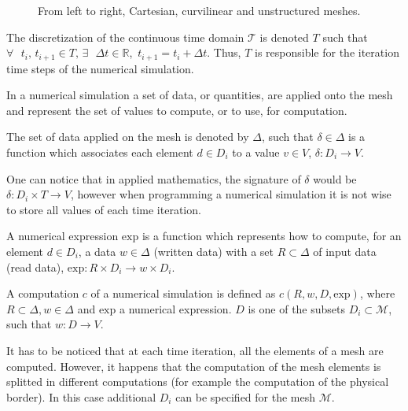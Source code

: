 \begin{figure}[!h]\begin{center}
  \caption{From left to right, Cartesian, curvilinear and unstructured meshes.}
  \label{fig:mesh}
\end{center}\end{figure}

\begin{mydef}
The discretization of the continuous time domain $\mathcal{T}$ is denoted $T$ such that $\forall\mbox{ }t_i\mbox{, }t_{i+1} \in T\mbox{, }\exists\mbox{ }\Delta t \in \mathbb{R}$\mbox{, }$t_{i+1} = t_i + \Delta t$. Thus, $T$ is responsible for the iteration time steps of the numerical simulation. 
\end{mydef}

In a numerical simulation a set of data, or quantities, are applied onto the mesh and represent the set of values to compute, or to use, for computation.

\begin{mydef}
The set of data applied on the mesh is denoted by $\Delta$, such that $\delta \in \Delta$ is a function which associates each element $d \in D_i$ to a value $v \in V$, $\delta : D_i \rightarrow V$.
\end{mydef}
One can notice that in applied mathematics, the signature of $\delta$ would be $\delta : D_i \times T \rightarrow V$, however when programming a numerical simulation it is not wise to store all values of each time iteration.

\begin{mydef}
A numerical expression $\text{exp}$ is a function which represents how to compute, for an element $d \in D_i$, a data $w \in \Delta$ (written data) with a set $R \subset \Delta$ of input data (read data), $\text{exp} : R \times D_i \rightarrow w \times D_i$.
\end{mydef}

\begin{mydef}
A computation $c$ of a numerical simulation is defined as $c(R,w,D,\text{exp})$, where $R \subset \Delta, w \in \Delta$ and $\text{exp}$ a numerical expression. $D$ is one of the subsets $D_i \subset \mathcal{M}$, such that $w : D \rightarrow V$.
\end{mydef}
It has to be noticed that at each time iteration, all the elements of a mesh are computed. However, it happens that the computation of the mesh elements is splitted in different computations (for example the computation of the physical border). In this case additional $D_i$ can be specified for the mesh $\mathcal{M}$.

